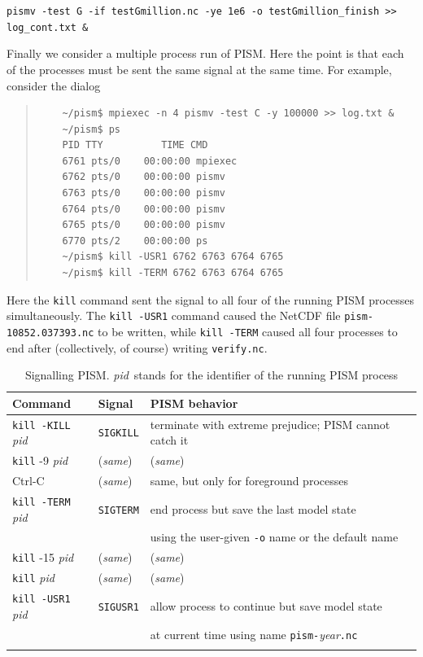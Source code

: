 \documentclass[11pt,final]{amsart}
\begin{document}
\verb|pismv -test G -if testGmillion.nc -ye 1e6 -o testGmillion_finish >> log_cont.txt &|
\smallskip

Finally we consider a multiple process run of PISM.  Here the point is that each of the processes must be sent the same signal at the same time.  For example, consider the dialog
\begin{quote}
\begin{verbatim}
	~/pism$ mpiexec -n 4 pismv -test C -y 100000 >> log.txt &
	~/pism$ ps
	PID TTY          TIME CMD
	6761 pts/0    00:00:00 mpiexec
	6762 pts/0    00:00:00 pismv
	6763 pts/0    00:00:00 pismv
	6764 pts/0    00:00:00 pismv
	6765 pts/0    00:00:00 pismv
	6770 pts/2    00:00:00 ps
	~/pism$ kill -USR1 6762 6763 6764 6765
	~/pism$ kill -TERM 6762 6763 6764 6765
\end{verbatim}
\end{quote}
Here the \verb|kill| command sent the signal to all four of the running PISM processes simultaneously.  The \verb|kill -USR1| command caused the NetCDF file \verb|pism-10852.037393.nc| to be written, while \verb|kill -TERM| caused all four processes to end after (collectively, of course) writing \verb|verify.nc|.

\newcommand\pid{\textsl{pid}}
\newcommand\same{(\textsl{same})}
\begin{table}[h]
\caption{Signalling PISM.  \pid~stands for the identifier of the running PISM process}\label{tab:signals}
\begin{tabular}{@{}llll}\hline
\textbf{Command}\phantom{bobbob} & \textbf{Signal}\phantom{bobbob} & \textbf{PISM behavior} \\ \hline
\texttt{kill -KILL} \pid & \texttt{SIGKILL} & terminate with extreme prejudice; PISM cannot catch it \\
\texttt{kill} -9 \pid & \same & \same \\
Ctrl-C & \same & same, but only for foreground processes  \\ \hline
\texttt{kill -TERM} \pid & \texttt{SIGTERM} & end process but save the last model state \\
 &  & using the user-given \verb|-o| name or the default name \\
\texttt{kill} -15 \pid & \same & \same \\
\texttt{kill} \pid & \same & \same \\ \hline
\texttt{kill -USR1} \pid & \texttt{SIGUSR1} & allow process to continue but save model state \\
 &  & at current time using name \texttt{pism-}\textsl{year}\texttt{.nc} \\
\hline\normalsize
\end{tabular}
\end{table}
\end{document}
